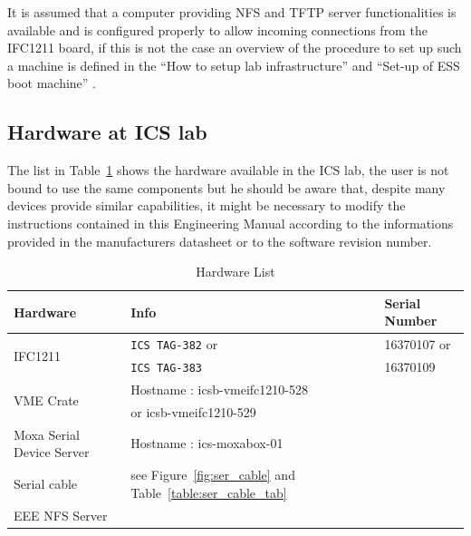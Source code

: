 \documentclass[11pt
  , a4paper
  , article
  , oneside
  , showtrims
]{memoir}
\begin{document}
It is assumed that a computer providing NFS and TFTP server functionalities is available and is configured properly to allow incoming connections from the IFC1211 board, if this is not the case an overview of the procedure to set up such a machine is defined in the ``How to setup lab infrastructure''\cite{SULI} and ``Set-up of ESS boot machine'' \cite{SETUP_LAB_INFRASTRUCTURE}.

\subsection{Hardware at ICS lab}
The list in Table~\ref{table:hwlist_ics} shows the hardware available in the ICS lab, the user is not bound to use the same components but he should be aware that, despite many devices provide similar capabilities, it might be necessary to modify the instructions contained in this Engineering Manual according to the informations provided in the manufacturers datasheet or to the software revision number.

\begin{table}[!hb]
  \centering
  \begin{tabular}{l|l|l}
    \toprule
    Hardware                  & Info                                                               & Serial Number              \\\midrule
    \multicolumn{1}{l|}{\multirow{2}{*}{IFC1211}}  & \texttt{ICS TAG-382} or                       & 16370107 or                \\
    \multicolumn{1}{l|}{}     & \texttt{ICS TAG-383}                                               & 16370109                   \\\midrule
    \multicolumn{1}{l|}{\multirow{2}{*}{VME Crate}}& Hostname : icsb-vmeifc1210-528                &                            \\
    \multicolumn{1}{l|}{}     & or icsb-vmeifc1210-529                                             &                            \\\midrule
    Moxa Serial Device Server & Hostname : ics-moxabox-01                                          &                            \\\midrule
    Serial cable              & see Figure~\ref{fig:ser_cable} and Table~\ref{table:ser_cable_tab} &                            \\\midrule
    EEE NFS Server            &                             &    \\\bottomrule
  \end{tabular}
  \caption[]{Hardware List}
  \label{table:hwlist_ics}
\end{table}
\FloatBarrier
\end{document}
